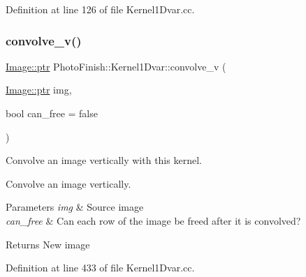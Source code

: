 Definition at line 126 of file Kernel1\+Dvar.\+cc.

\mbox{\label{class_photo_finish_1_1_kernel1_dvar_ad5b577268418278d8b3a62234c1de5a6}} 
\subsubsection{\texorpdfstring{convolve\+\_\+v()}{convolve\_v()}}
{\footnotesize\ttfamily \hyperlink{class_photo_finish_1_1_image_ab336203305ed3a1397d7245063353b5a}{Image\+::ptr} Photo\+Finish\+::\+Kernel1\+Dvar\+::convolve\+\_\+v (\begin{DoxyParamCaption}\item[{\hyperlink{class_photo_finish_1_1_image_ab336203305ed3a1397d7245063353b5a}{Image\+::ptr}}]{img,  }\item[{bool}]{can\+\_\+free = {\ttfamily false} }\end{DoxyParamCaption})}



Convolve an image vertically with this kernel. 

Convolve an image vertically.


\begin{DoxyParams}{Parameters}
{\em img} & Source image \\
\hline
{\em can\+\_\+free} & Can each row of the image be freed after it is convolved? \\
\hline
\end{DoxyParams}
\begin{DoxyReturn}{Returns}
New image 
\end{DoxyReturn}


Definition at line 433 of file Kernel1\+Dvar.\+cc.

\mbox{\label{class_photo_finish_1_1_kernel1_dvar_a8e3a75a667009d41d65b8218d6d67a6f}} 
